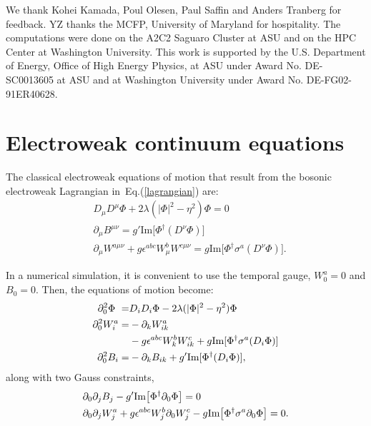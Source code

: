 \documentclass[prd,twocolumn,nofootinbib]{revtex4-1}
\begin{document}
\acknowledgements
We thank Kohei Kamada, Poul Olesen, Paul Saffin and Anders Tranberg for feedback.
YZ thanks the MCFP, University of Maryland for hospitality.
The computations were done on the A2C2 Saguaro Cluster at ASU and on the 
HPC Center at Washington University.
This work is supported by the U.S. Department of Energy, Office of High Energy Physics, 
at ASU under  Award No. DE-SC0013605 at ASU and at Washington University
under Award No. DE-FG02-91ER40628.

\appendix

\section{Electroweak continuum equations}
\label{sec:equations}

The classical electroweak equations of motion that result 
from the bosonic electroweak Lagrangian
in~Eq.(\ref{lagrangian}) are: 
\begin{align*}
	&D_\mu D^\mu \Phi + 2\lambda (\vert\Phi\vert^2-\eta^2)\Phi=0 \\ 
	&\partial_\mu B^{\mu\nu} = g' \text{Im} \big[ \Phi^\dagger (D^\nu \Phi) \big] \\ 
	&\partial_\mu W^{a\mu\nu} + g\epsilon^{abc} W^b_\mu W^{c\mu\nu} = g\text{Im} \big[ \Phi^\dag \sigma^a(D^\nu\Phi) \big].
\end{align*}

In a numerical simulation, it is convenient to use the temporal gauge, 
$W_0^a=0$ and $B_0=0$. Then, the equations of motion become:
\begin{align}
	\partial_0^2 \Phi\hphantom{{}_i} =& D_i D_i \Phi - 
	2\lambda (\vert \Phi \vert ^2 -\eta^2) \Phi  \notag\\ 
	\partial_0^2 W^a_i =&-\partial_k W^a_{ik}  \notag \\ 
&- g\epsilon^{abc}W^b_k W^c_{ik} + g\text{Im}[\Phi^\dagger \sigma^a(D_i\Phi)] 
	\notag \\  
\partial_0^2 B_i =& -\partial_k B_{ik}+g'\text{Im}[\Phi^\dagger(D_i\Phi)],
\end{align}
along with two Gauss constraints,
\begin{align}
	&\partial_0 \partial_j B_j -g'\text{Im}\big[ \Phi^\dagger \partial_0 \Phi \big] = 0 \notag \\ 
	& \partial_0 \partial_j W^a_j + g \epsilon^{abc} W^b_j \partial_0 W^c_j 
        -g\text{Im} \big[ \Phi^\dagger \sigma^a \partial_0 \Phi \big] =0.
\label{gauss-2}
\end{align}
\end{document}
